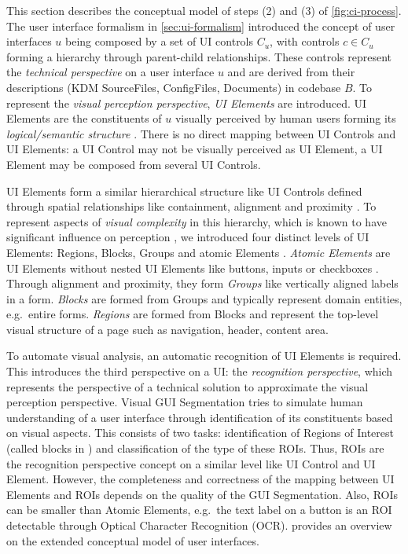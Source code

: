 This section describes the conceptual model of steps (2) and (3) of \cref{fig:ci-process}.
The user interface formalism in \cref{sec:ui-formalism} introduced the concept of user interfaces \(u\) being composed by a set of UI controls \(C_u\), with controls \(c\in C_u\) forming a hierarchy through parent-child relationships.
These controls represent the \emph{technical perspective} on a user interface \(u\) and are derived from their descriptions (KDM SourceFiles, ConfigFiles, Documents) in codebase \(B\).
To represent the \emph{visual perception perspective}, \emph{UI Elements} are introduced.
UI Elements are the constituents of \(u\) visually perceived by human users forming its \emph{logical/semantic structure} \autocite{Sanoja2014,Cai2003VIPS}.
There is no direct mapping between UI Controls and UI Elements: a UI Control may not be visually perceived as UI Element, a UI Element may be composed from several UI Controls.

UI Elements form a similar hierarchical structure like UI Controls defined through spatial relationships like containment, alignment and proximity \autocite{RoyChoudhary2014XPERT,Kong2012,Talton2011Bricolage}.
To represent aspects of \emph{visual complexity} \autocite{Bakaev2019JWE} in this hierarchy, which is known to have significant influence on perception \autocite{Tuch2009VisualComplexity}, we introduced four distinct levels of UI Elements: Regions, Blocks, Groups and atomic Elements \autocite{Heil2016Similarity}.
\emph{Atomic Elements} \autocite{Bakaev2019JWE} are UI Elements without nested UI Elements like buttons, inputs or checkboxes \autocite{Kong2012}.
Through alignment and proximity, they form \emph{Groups} like vertically aligned labels in a form.
\emph{Blocks} are formed from Groups and typically represent domain entities, e.g.~entire forms.
\emph{Regions} are formed from Blocks and represent the top-level visual structure of a page such as navigation, header, content area.

To automate visual analysis, an automatic recognition of UI Elements is required.
This introduces the third perspective on a UI: the \emph{recognition perspective}, which represents the perspective of a technical solution to approximate the visual perception perspective.
Visual GUI Segmentation tries to simulate human understanding of a user interface through identification of its constituents based on visual aspects.
This consists of two tasks: identification of Regions of Interest \autocite{Saar2016Browserbite} (called blocks in \autocite{Sanoja2014,Cai2003VIPS}) and classification of the type of these ROIs.
Thus, ROIs are the recognition perspective concept on a similar level like UI Control and UI Element.
However, the completeness and correctness of the mapping between UI Elements and ROIs depends on the quality of the GUI Segmentation.
Also, ROIs can be smaller than Atomic Elements, e.g.~the text label on a button is an ROI detectable through Optical Character Recognition (OCR).
 provides an overview on the extended conceptual model of user interfaces.

